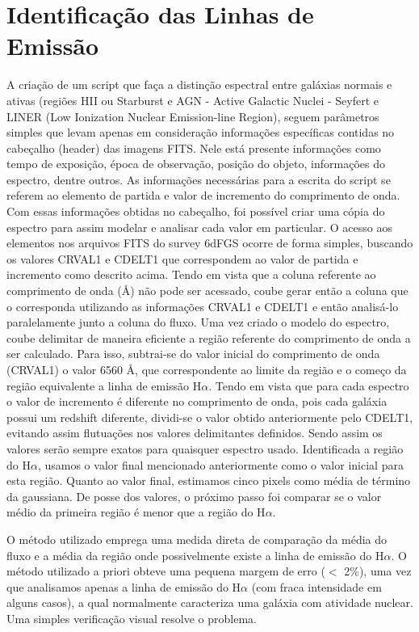 \section{Identificação das Linhas de Emissão}

A criação de um script que faça a distinção espectral entre galáxias normais e ativas (regiões HII ou Starburst e AGN - Active Galactic Nuclei - Seyfert e LINER (Low Ionization Nuclear Emission-line Region), seguem parâmetros simples que levam apenas em consideração informações específicas contidas no cabeçalho (header) das imagens FITS. Nele está presente informações como tempo de exposição, época de observação, posição do objeto, informações do espectro, dentre outros. As informações necessárias para a escrita do script se referem ao elemento de partida e valor de incremento do comprimento de onda. Com essas informações obtidas no cabeçalho, foi possível criar uma cópia do espectro para assim modelar e analisar cada valor em particular. O acesso aos elementos nos arquivos FITS do survey 6dFGS ocorre de forma simples, buscando os valores CRVAL1 e CDELT1 que correspondem ao valor de partida e incremento como descrito acima. Tendo em vista que a coluna referente ao comprimento de onda (\AA) não pode ser acessado, coube gerar então a coluna que o corresponda utilizando as informações CRVAL1 e CDELT1 e então analisá-lo paralelamente junto a coluna do fluxo. Uma vez criado o modelo do espectro, coube delimitar de maneira eficiente a região referente do comprimento de onda a ser calculado. Para isso, subtrai-se do valor inicial do comprimento de onda (CRVAL1) o valor 6560 \AA, que correspondente ao limite da região e o começo da região equivalente a linha de emissão H$\alpha$. Tendo em vista que para cada espectro o valor de incremento é diferente no comprimento de onda, pois cada galáxia possui um redshift diferente, dividi-se o valor obtido anteriormente pelo CDELT1, evitando assim flutuações nos valores delimitantes definidos. Sendo assim os valores serão sempre exatos para quaisquer espectro usado. Identificada a região do H$\alpha$, usamos o valor final mencionado anteriormente como o valor inicial para esta região. Quanto ao valor final, estimamos cinco pixels como média de término da gaussiana. De posse dos valores, o próximo passo foi comparar se o valor médio da primeira região é menor que a região do H$\alpha$. 

O método utilizado emprega uma medida direta de comparação da média do fluxo e a média da região onde possivelmente existe a linha de emissão do H$\alpha$. O método utilizado a priori obteve uma pequena margem de erro ($<$ 2\%), uma vez que analisamos apenas a linha de emissão do H$\alpha$ (com fraca intensidade em alguns casos), a qual normalmente caracteriza uma galáxia com atividade nuclear. Uma simples verificação visual resolve o problema.

